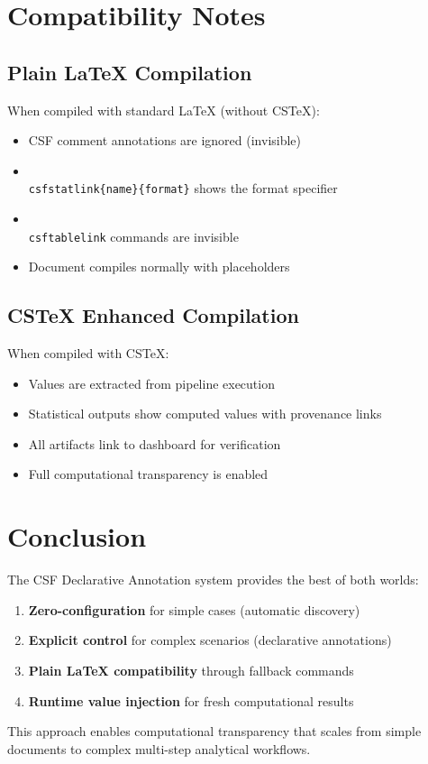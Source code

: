\documentclass{article}
\begin{document}

\section{Compatibility Notes}

\subsection{Plain LaTeX Compilation}

When compiled with standard LaTeX (without CSTeX):
\begin{itemize}
    \item CSF comment annotations are ignored (invisible)
    \item \texttt{\\csfstatlink\{name\}\{format\}} shows the format specifier
    \item \texttt{\\csftablelink} commands are invisible
    \item Document compiles normally with placeholders
\end{itemize}

\subsection{CSTeX Enhanced Compilation}

When compiled with CSTeX:
\begin{itemize}
    \item Values are extracted from pipeline execution
    \item Statistical outputs show computed values with provenance links
    \item All artifacts link to dashboard for verification
    \item Full computational transparency is enabled
\end{itemize}

\section{Conclusion}

The CSF Declarative Annotation system provides the best of both worlds:
\begin{enumerate}
    \item \textbf{Zero-configuration} for simple cases (automatic discovery)
    \item \textbf{Explicit control} for complex scenarios (declarative annotations)
    \item \textbf{Plain LaTeX compatibility} through fallback commands
    \item \textbf{Runtime value injection} for fresh computational results
\end{enumerate}

This approach enables computational transparency that scales from simple documents 
to complex multi-step analytical workflows.
\end{document}
